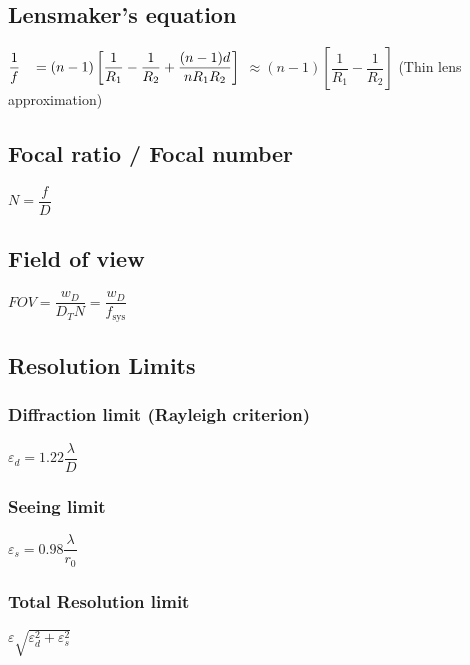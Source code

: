 \subsection{Lensmaker's equation}
\begin{itemize}
\itemt \( \dfrac{1}{f} \hspace*{0.3cm} = (n-1)\left[\dfrac{1}{R_1} - \dfrac{1}{R_2}+\dfrac{(n-1)d}{nR_1R_2}\right] \)
\subitem \hspace*{0.85cm} \( \approx (n-1)\left[\dfrac{1}{R_1} - \dfrac{1}{R_2}\right] \) \tab     (Thin lens approximation)
\end{itemize}

\subsection{Focal ratio / Focal number}
\begin{itemize}
\itemt \( N = \dfrac{f}{D} \)
\end{itemize}			

\subsection{Field of view}		
\begin{itemize}
\itemt \( FOV = \dfrac{w_D}{D_T N} = \dfrac{w_D}{f_\mathrm{sys}} \)
\end{itemize}

\subsection{Resolution Limits}		

\subsubsection{Diffraction limit (Rayleigh criterion)}			
\begin{itemize}
\itemt \( \varepsilon_d = 1.22 \dfrac{\lambda}{D} \)
\end{itemize}			

\subsubsection{Seeing limit}			
\begin{itemize}
\itemt \( \varepsilon_s = 0.98 \dfrac{\lambda}{r_0} \)
\end{itemize}

\subsubsection{Total Resolution limit}			
\begin{itemize}
\itemt \( \varepsilon \sqrt{\varepsilon_d^2 + \varepsilon_s^2} \)
\end{itemize}

